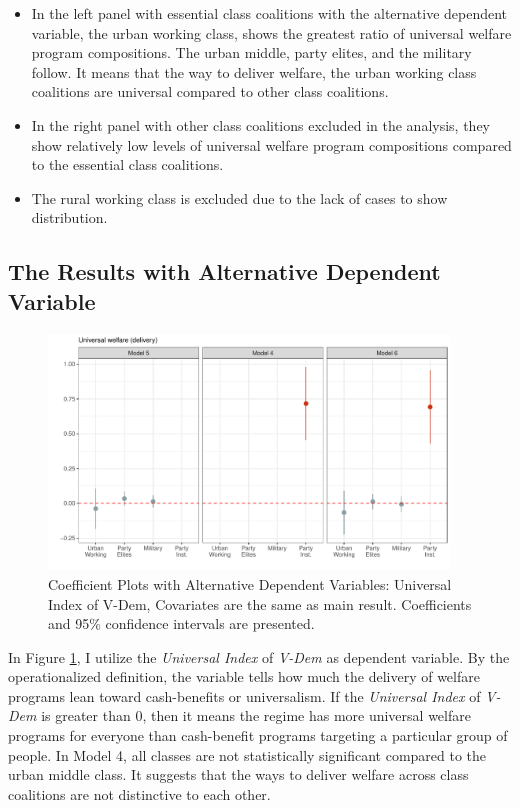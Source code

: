 \documentclass[12pt]{article}
\begin{document}
	\begin{itemize}
		\item In the left panel with essential class coalitions with the alternative dependent variable, the urban working class, shows the greatest ratio of universal welfare program compositions. The urban middle, party elites, and the military follow. It means that the way to deliver welfare, the urban working class coalitions are universal compared to other class coalitions.
		\item In the right panel with other class coalitions excluded in the analysis, they show relatively low levels of universal welfare program compositions compared to the essential class coalitions.
		\item The rural working class is excluded due to the lack of cases to show distribution.
	\end{itemize}
	
	\subsection{The Results with Alternative Dependent Variable}
	
	\begin{figure}[!ht]
		\centering
		\includegraphics[width=0.95\textwidth]{"2_Figures/Appendix/Appendix6"}
		\caption{Coefficient Plots with Alternative Dependent Variables:
			Universal Index of V-Dem, Covariates are the same as main result.
			Coefficients and 95\% confidence intervals are presented.}
		\label{fig:figure10}
	\end{figure}
	
	In Figure \ref{fig:figure10}, I utilize the \textit{Universal Index} of \textit{V-Dem} as dependent variable. By the operationalized definition, the variable tells how much the delivery of welfare programs lean toward cash-benefits or universalism. If the \textit{Universal Index} of \textit{V-Dem} is greater than 0, then it means the regime has more universal welfare programs for everyone than cash-benefit programs targeting a particular group of people. In Model 4, all classes are not statistically significant compared to the urban middle class. It suggests that the ways to deliver welfare across class coalitions are not distinctive to each other.
	
\end{document}
